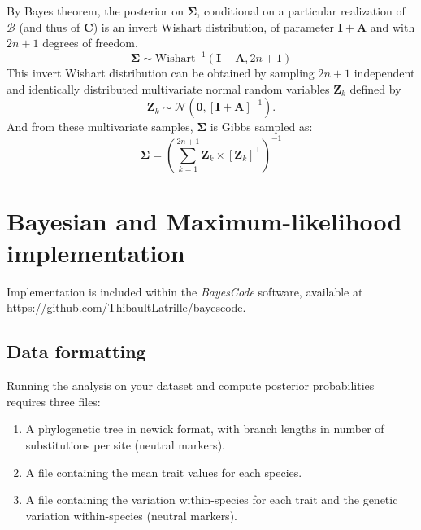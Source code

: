 \documentclass{article}
\newcommand{\MultiplyMatrix}{\times}
\newcommand{\UniDimArray}[1]{\bm{#1}}
\newcommand{\BiDimArray}[1]{\bm{#1}}
\newcommand{\tr}{^{\intercal}}
\newcommand{\inv}{^{-1}}
\newcommand{\NbrTaxa}{n}
\newcommand{\VecZero}{\UniDimArray{0}}
\newcommand{\WishartPostDf}{2 \NbrTaxa + 1}
\newcommand{\contrast}{\UniDimArray{C}}
\newcommand{\Covariancematrix}{\Sigma}
\newcommand{\CovarianceMatrix}{\BiDimArray{\Covariancematrix}}
\newcommand{\Identitymatrix}{\BiDimArray{I}}
\newcommand{\brownian}{\mathcal{B}}
\newcommand{\Brownian}{\UniDimArray{\brownian}}
\newcommand{\Scattermatrix}{\BiDimArray{A}}
\newcommand{\Multivariate}{\UniDimArray{Z}}
\begin{document}
By Bayes theorem, the {posterior} on $\CovarianceMatrix$, conditional on a particular realization of $\Brownian$ (and thus of $\contrast$) is an invert Wishart distribution, of parameter $\Identitymatrix + \Scattermatrix$ and with $\WishartPostDf$ degrees of freedom.
\begin{equation}
    \CovarianceMatrix \sim \text{Wishart}^{-1}\left( \Identitymatrix + \Scattermatrix, \WishartPostDf\right)\label{eq:bayes-posterior}
\end{equation}
This invert Wishart distribution can be obtained by sampling $\WishartPostDf$ independent and identically distributed multivariate normal random variables $\Multivariate_{k}$ defined by
\begin{equation}
    \Multivariate_{k} \sim \mathcal{N} \left( \VecZero, \left[ \Identitymatrix + \Scattermatrix\right]^{-1} \right).\label{eq:bayes-multivariate}
\end{equation}
And from these multivariate samples, $\CovarianceMatrix$ is Gibbs sampled as:
\begin{equation}
    \CovarianceMatrix = \left( \sum\limits_{k=1}^{\WishartPostDf} \Multivariate_{k} \MultiplyMatrix  \left[\Multivariate_{k} \right] \tr \right)\inv \label{eq:bayes-gibbs}
\end{equation}

\newpage
\section{Bayesian and Maximum-likelihood implementation}\label{sec:implementation}

Implementation is included within the \textit{BayesCode} software, available at \url{https://github.com/ThibaultLatrille/bayescode}.

\subsection{Data formatting}\label{subsec:data-formatting}

Running the analysis on your dataset and compute posterior probabilities requires three files:
\begin{enumerate}
    \item A phylogenetic tree in newick format, with branch lengths in number of substitutions per site (neutral markers).
    \item A file containing the mean trait values for each species.
    \item A file containing the variation within-species for each trait and the genetic variation within-species (neutral markers).
\end{enumerate}
\end{document}
